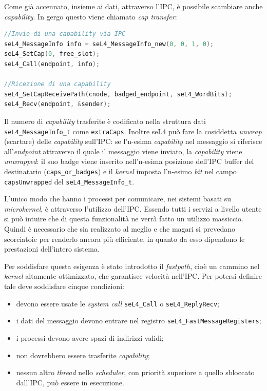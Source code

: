 Come già accennato, insieme ai dati, attraverso l'IPC, è possibile scambiare anche \textit{capability}. In gergo questo viene chiamato \textit{cap transfer}:
\begin{lstlisting}[language=C++]
//Invio di una capability via IPC
seL4_MessageInfo info = seL4_MessageInfo_new(0, 0, 1, 0);
seL4_SetCap(0, free_slot);
seL4_Call(endpoint, info);

//Ricezione di una capability
seL4_SetCapReceivePath(cnode, badged_endpoint, seL4_WordBits);
seL4_Recv(endpoint, &sender);
\end{lstlisting}

Il numero di \textit{capability} trasferite è codificato nella struttura dati \texttt{seL4\_MessageInfo\_t} come \texttt{extraCaps}.
Inoltre seL4 può fare la cosiddetta \textit{unwrap} (scartare) delle \textit{capability} sull'IPC: se l'n-esima \textit{capability} nel messaggio si riferisce all'\textit{endpoint} attraverso il quale il messaggio viene inviato, la \textit{capability} viene \textit{unwrapped}: il suo badge viene inserito nell'n-esima posizione dell'IPC buffer del destinatario (\texttt{caps\_or\_badges}) e il \textit{kernel} imposta l'n-esimo \textit{bit} nel campo \texttt{capsUnwrapped} del \texttt{seL4\_MessageInfo\_t}.

L'unico modo che hanno i processi per comunicare, nei sistemi basati su \textit{microkernel}, è attraverso l'utilizzo dell'IPC. Essendo tutti i servizi a livello utente si può intuire che di questa funzionalità ne verrà fatto un utilizzo massiccio. Quindi è necessario che sia realizzato al meglio e che magari si prevedano scorciatoie per renderlo ancora più efficiente, in quanto da esso dipendono le prestazioni dell'intero sistema.

Per soddisfare questa esigenza è stato introdotto il \textit{fastpath}, cioè un cammino nel \textit{kernel} altamente ottimizzato, che garantisce velocità nell'IPC. Per potersi definire tale deve soddisfare cinque condizioni:
\begin{itemize}
	\item devono essere usate le \textit{system call} \texttt{seL4\_Call} o \texttt{seL4\_ReplyRecv};
	\item i dati del messaggio devono entrare nel registro \texttt{seL4\_FastMessageRegisters};
	\item i processi devono avere spazi di indirizzi validi;
	\item non dovrebbero essere trasferite \textit{capability};
	\item nessun altro \textit{thread} nello \textit{scheduler}, con priorità superiore a quello sbloccato dall'IPC, può essere in esecuzione.
\end{itemize}

